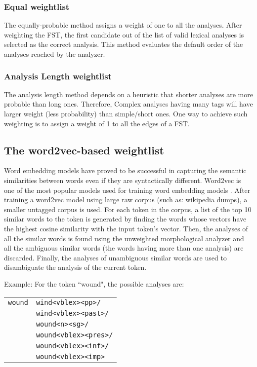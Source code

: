 \documentclass[free]{flammie}
\begin{document}
\subsubsection{Equal weightlist}
The equally-probable method assigns a weight of one to all the analyses.  After
weighting the FST, the first candidate out of the list of valid lexical analyses
is selected as the correct analysis.  This method evaluates the default order of
the analyses reached by the analyzer.

\subsubsection{Analysis Length weightlist}
The analysis length method depends on a heuristic that shorter analyses are more
probable than long ones. Therefore, Complex analyses having many tags will have
larger weight (less probability) than simple/short ones. One way to achieve such
weighting is to assign a weight of 1 to all the edges of a FST.

\subsection{The word2vec-based weightlist}
Word embedding models have proved to be successful in capturing the semantic
similarities between words even if they are syntactically different.  Word2vec
is one of the most popular models used for training word embedding models
\cite{mikolov2013efficient}.  After training a word2vec model using large raw
corpus (such as: wikipedia dumps), a smaller untagged corpus is used.  For each
token in the corpus, a list of the top 10 similar words to the token is
generated by finding the words whose vectors have the highest cosine similarity
with the input token's vector.  Then, the analyses of all the similar words is
found using the unweighted morphological analyzer and all the ambiguous similar
words (the words having more than one analysis) are discarded. Finally, the
analyses of unambiguous similar words are used to disambiguate the analysis of
the current token.



Example:
For the token ``wound", the possible analyses are:

\begin{tabular}{ |p{2cm}|p{5.5cm}|}
 \hline
\texttt{wound} & \texttt{wind<vblex><pp>/} \\
      & \texttt{wind<vblex><past>/} \\
      & \texttt{wound<n><sg>/} \\
      & \texttt{wound<vblex><pres>/} \\
      & \texttt{wound<vblex><inf>/} \\
      & \texttt{wound<vblex><imp>} \\
\hline
\end{tabular}
\end{document}
